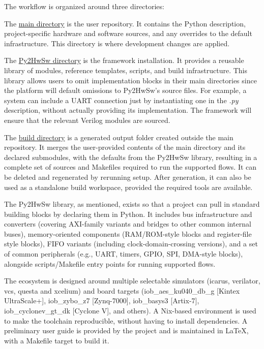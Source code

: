 The workflow is organized around three directories:

The \underline{main directory} is the user repository. It contains the Python description, project-specific hardware and software sources, and any overrides to the default infrastructure. This directory is where development changes are applied.

The \underline{Py2HwSw directory} is the framework installation. It provides a reusable library of modules, reference templates, scripts, and build infrastructure. This library allows users to omit implementation blocks in their main directories since the platform will default omissions to Py2HwSw's source files. For example, a system can include a UART connection just by instantiating one in the \textit{.py} description, without actually providing its implementation. The framework will ensure that the relevant Verilog modules are sourced.

The \underline{build directory} is a generated output folder created outside the main repository. It merges the user-provided contents of the main directory and its declared submodules, with the defaults from the Py2HwSw library, resulting in a complete set of sources and Makefiles required to run the supported flows. It can be deleted and regenerated by rerunning setup. After generation, it can also be used as a standalone build workspace, provided the required tools are available.

The Py2HwSw library, as mentioned, exists so that a project can pull in standard building blocks by declaring them in Python. It includes bus infrastructure and converters (covering AXI-family variants and bridges to other common internal buses), memory-oriented components (RAM/ROM-style blocks and register-file style blocks), FIFO variants (including clock-domain-crossing versions), and a set of common peripherals (e.g., UART, timers, GPIO, SPI, DMA-style blocks), alongside scripts/Makefile entry points for running supported flows.

The ecosystem is designed around multiple selectable simulators (icarus, verilator, vcs, questa and xcelium) and board targets (iob\_aes\_ku040\_db\_g [Kintex UltraScale+], iob\_zybo\_z7 [Zynq-7000], iob\_basys3 [Artix-7], iob\_cyclonev\_gt\_dk [Cyclone V], and others). A Nix-based environment is used to make the toolchain reproducible, without having to install dependencies. A preliminary user guide is provided by the project and is maintained in LaTeX, with a Makefile target to build it.


